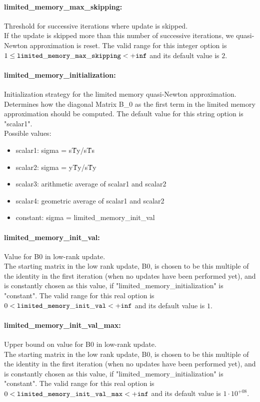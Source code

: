 \paragraph{limited\_memory\_max\_skipping:}\label{opt:limited_memory_max_skipping} Threshold for successive iterations where update is skipped. \\
 If the update is skipped more than this number of successive iterations, we quasi-Newton approximation is reset. The valid range for this integer option is
$1 \le {\tt limited\_memory\_max\_skipping } <  {\tt +inf}$
and its default value is $2$.


\paragraph{limited\_memory\_initialization:}\label{opt:limited_memory_initialization} Initialization strategy for the limited memory quasi-Newton approximation. \\
 Determines how the diagonal Matrix B\_0 as the first term in the limited memory approximation should be computed. The default value for this string option is "scalar1".
\\ 
Possible values:
\begin{itemize}
   \item scalar1: sigma = s\^Ty/s\^Ts
   \item scalar2: sigma = y\^Ty/s\^Ty
   \item scalar3: arithmetic average of scalar1 and scalar2
   \item scalar4: geometric average of scalar1 and scalar2
   \item constant: sigma = limited\_memory\_init\_val
\end{itemize}

\paragraph{limited\_memory\_init\_val:}\label{opt:limited_memory_init_val} Value for B0 in low-rank update. \\
 The starting matrix in the low rank update, B0, is chosen to be this multiple of the identity in the first iteration (when no updates have been performed yet), and is constantly chosen as this value, if "limited\_memory\_initialization" is "constant". The valid range for this real option is 
$0 <  {\tt limited\_memory\_init\_val } <  {\tt +inf}$
and its default value is $1$.


\paragraph{limited\_memory\_init\_val\_max:}\label{opt:limited_memory_init_val_max} Upper bound on value for B0 in low-rank update. \\
 The starting matrix in the low rank update, B0, is chosen to be this multiple of the identity in the first iteration (when no updates have been performed yet), and is constantly chosen as this value, if "limited\_memory\_initialization" is "constant". The valid range for this real option is 
$0 <  {\tt limited\_memory\_init\_val\_max } <  {\tt +inf}$
and its default value is $1 \cdot 10^{+08}$.


